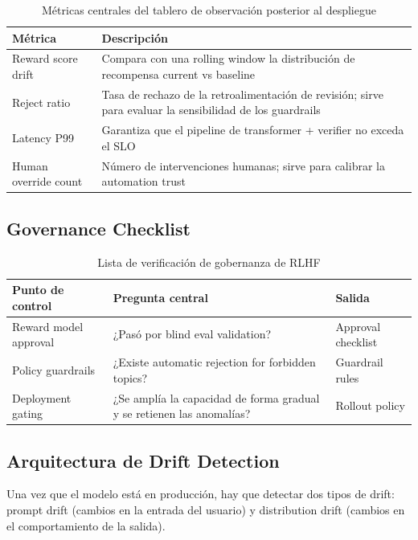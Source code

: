 \begin{table}[H]
\centering
\begin{tabular}{p{} p{}}
\toprule
Métrica & Descripción \\
\midrule
Reward score drift & Compara con una rolling window la distribución de recompensa current vs baseline \\
Reject ratio & Tasa de rechazo de la retroalimentación de revisión; sirve para evaluar la sensibilidad de los guardrails \\
Latency P99 & Garantiza que el pipeline de transformer + verifier no exceda el SLO \\
Human override count & Número de intervenciones humanas; sirve para calibrar la automation trust \\
\bottomrule
\end{tabular}
\caption{Métricas centrales del tablero de observación posterior al despliegue}
\end{table}

\subsection{Governance Checklist}

\begin{table}[H]
\centering
\begin{tabular}{p{} p{} p{}}
\toprule
Punto de control & Pregunta central & Salida \\
\midrule
Reward model approval & ¿Pasó por blind eval validation? & Approval checklist \\
Policy guardrails & ¿Existe automatic rejection for forbidden topics? & Guardrail rules \\
Deployment gating & ¿Se amplía la capacidad de forma gradual y se retienen las anomalías? & Rollout policy \\
\bottomrule
\end{tabular}
\caption{Lista de verificación de gobernanza de RLHF}
\end{table}

\subsection{Arquitectura de Drift Detection}

Una vez que el modelo está en producción, hay que detectar dos tipos de drift: prompt drift (cambios en la entrada del usuario) y distribution drift (cambios en el comportamiento de la salida).

